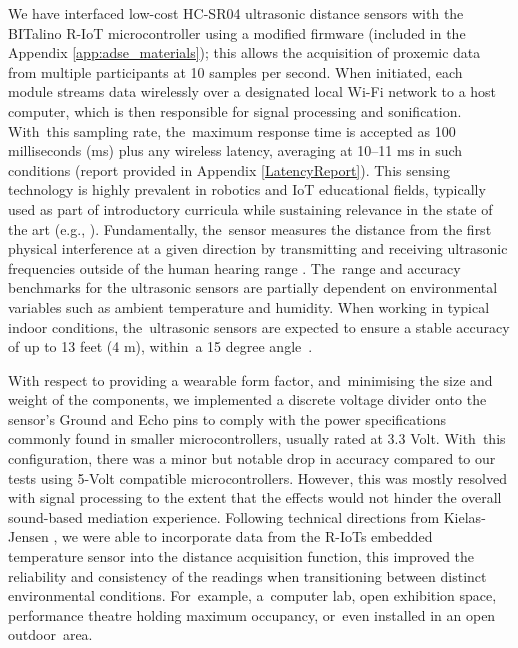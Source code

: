 {We have interfaced low-cost HC-SR04 ultrasonic distance sensors with the BITalino R-IoT microcontroller using a modified firmware (included in the Appendix \ref{app:adse_materials}); this allows the acquisition of proxemic data from multiple participants at 10 samples per second. When initiated, each module streams data wirelessly over a designated local Wi-Fi network to a host computer, which is then responsible for signal processing and sonification. With~this sampling rate, the~maximum response time is accepted as 100 milliseconds (ms) plus any wireless latency, averaging at 10--11 ms in such conditions (report provided in Appendix \ref{LatencyReport}). This sensing technology is highly prevalent in robotics and IoT educational fields, typically used as part of introductory curricula \citep{hernandez-barrera_teaching_2014,garcia-ruiz_integrating_2018} while sustaining relevance in the state of the art (e.g., \cite{eguchi_proto-chair_2020,xu_analyzing_2018}). Fundamentally, the~sensor measures the distance from the first physical interference at a given direction by transmitting and receiving ultrasonic frequencies outside of the human hearing range \citep{pal_distance_2015}. The~range and accuracy benchmarks for the ultrasonic sensors are partially dependent on environmental variables such as ambient temperature and humidity. When working in typical indoor conditions, the~ultrasonic sensors are expected to ensure a stable accuracy of up to 13 feet (4 m), within~a 15 degree angle~\cite{abreu_low-cost_2021}.

With respect to providing a wearable form factor, and~minimising the size and weight of the components, we implemented a discrete voltage divider onto the sensor’s Ground and Echo pins to comply with the power specifications commonly found in smaller microcontrollers, usually rated at 3.3 Volt. With~this configuration, there was a minor but notable drop in accuracy compared to our tests using 5-Volt compatible microcontrollers. However, this was mostly resolved with signal processing to the extent that the effects would not hinder the overall sound-based mediation experience. Following technical directions from Kielas-Jensen \citep{magicbycalvin_improve_nodate}, we were able to incorporate data from the R-IoTs embedded temperature sensor into the distance acquisition function, this improved the reliability and consistency of the readings when transitioning between distinct environmental conditions. For~example, a~computer lab, open exhibition space, performance theatre holding maximum occupancy, or~even installed in an open outdoor~area.

}
